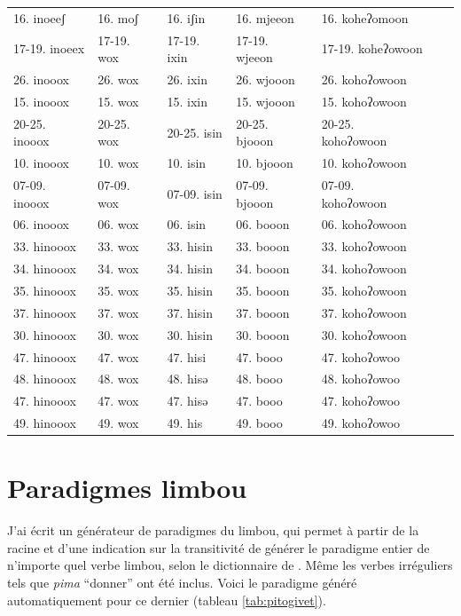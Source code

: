 \documentclass[oldfontcommands,oneside,a4paper,11pt]{memoir}
\begin{document}
\begin{table}[h]
{\begin{tabular}{lllllll}
	16. inoeeʃ 	&	16. moʃ 	&	16. iʃin 	&	16. mjeeon 	&	16. koheʔomoon 	\\
	17-19. inoeex 	&	17-19. wox 	&	17-19. ixin 	&	17-19. wjeeon 	&	17-19. koheʔowoon 	\\
	26. inooox 	&	26. wox 	&	26. ixin 	&	26. wjooon 	&	26. kohoʔowoon 	\\
	15. inooox 	&	15. wox 	&	15. ixin 	&	15. wjooon 	&	15. kohoʔowoon 	\\
	20-25. inooox 	&	20-25. wox 	&	20-25. isin 	&	20-25. bjooon 	&	20-25. kohoʔowoon 	\\
	10. inooox 	&	10. wox 	&	10. isin 	&	10. bjooon 	&	10. kohoʔowoon 	\\
	07-09. inooox 	&	07-09. wox 	&	07-09. isin 	&	07-09. bjooon 	&	07-09. kohoʔowoon 	\\
	06. inooox 	&	06. wox 	&	06. isin 	&	06. booon 	&	06. kohoʔowoon 	\\
	33. hinooox 	&	33. wox 	&	33. hisin 	&	33. booon 	&	33. kohoʔowoon 	\\
	34. hinooox 	&	34. wox 	&	34. hisin 	&	34. booon 	&	34. kohoʔowoon 	\\
	35. hinooox 	&	35. wox 	&	35. hisin 	&	35. booon 	&	35. kohoʔowoon 	\\
	37. hinooox 	&	37. wox 	&	37. hisin 	&	37. booon 	&	37. kohoʔowoon 	\\
	30. hinooox 	&	30. wox 	&	30. hisin 	&	30. booon 	&	30. kohoʔowoon 	\\
	47. hinooox 	&	47. wox 	&	47. hisi 	&	47. booo 	&	47. kohoʔowoo 	\\
	48. hinooox 	&	48. wox 	&	48. hisə 	&	48. booo 	&	48. kohoʔowoo 	\\
	47. hinooox 	&	47. wox 	&	47. hisə 	&	47. booo 	&	47. kohoʔowoo 	\\
	49. hinooox 	&	49. wox 	&	49. his 	&	49. booo 	&	49. kohoʔowoo 	\\

\bottomrule
\end{tabular}}
\end{table}



\section{Paradigmes limbou}
J'ai écrit un générateur de paradigmes du limbou, qui permet à partir de la racine et d'une indication sur la transitivité de générer le paradigme entier de n'importe quel verbe limbou, selon le dictionnaire de \citet{michailovsky02dico}. Même les verbes irréguliers tels que \textit{pima} ``donner'' ont été inclus. Voici le paradigme généré automatiquement pour ce dernier (tableau \ref{tab:pitogivet}).
\end{document}
